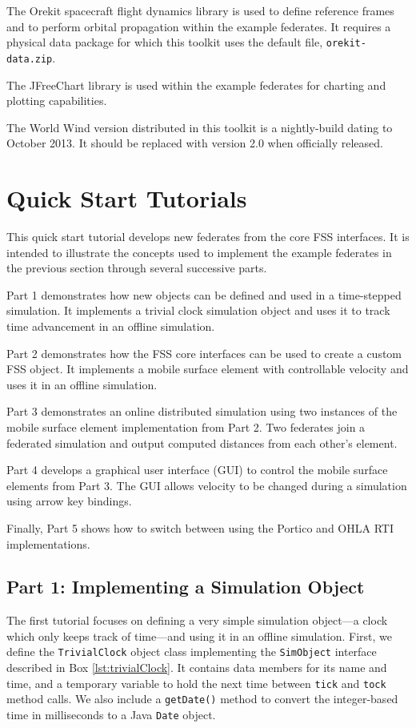 \documentclass[]{article}
\begin{document}
The Orekit spacecraft flight dynamics library is used to define reference frames and to perform orbital propagation within the example federates. It requires a physical data package for which this toolkit uses the default file, \texttt{orekit-data.zip}.

The JFreeChart library is used within the example federates for charting and plotting capabilities.

The World Wind version distributed in this toolkit is a nightly-build dating to October 2013. It should be replaced with version 2.0 when officially released.

\section{Quick Start Tutorials}

This quick start tutorial develops new federates from the core FSS interfaces. It is intended to illustrate the concepts used to implement the example federates in the previous section through several successive parts.

Part 1 demonstrates how new objects can be defined and used in a time-stepped simulation. It implements a trivial clock simulation object and uses it to track time advancement in an offline simulation.

Part 2 demonstrates how the FSS core interfaces can be used to create a custom FSS object. It implements a mobile surface element with controllable velocity and uses it in an offline simulation.

Part 3 demonstrates an online distributed simulation using two instances of the mobile surface element implementation from Part 2. Two federates join a federated simulation and output computed distances from each other's element.

Part 4 develops a graphical user interface (GUI) to control the mobile surface elements from Part 3. The GUI allows velocity to be changed during a simulation using arrow key bindings.

Finally, Part 5 shows how to switch between using the Portico and OHLA RTI implementations.

\subsection{Part 1: Implementing a Simulation Object}

The first tutorial focuses on defining a very simple simulation object---a clock which only keeps track of time---and using it in an offline simulation. First, we define the \texttt{TrivialClock} object class implementing the \texttt{SimObject} interface described in Box \ref{lst:trivialClock}. It contains data members for its name and time, and a temporary variable to hold the next time between \texttt{tick} and \texttt{tock} method calls. We also include a \texttt{getDate()} method to convert the integer-based time in milliseconds to a Java \texttt{Date} object.
\end{document}
